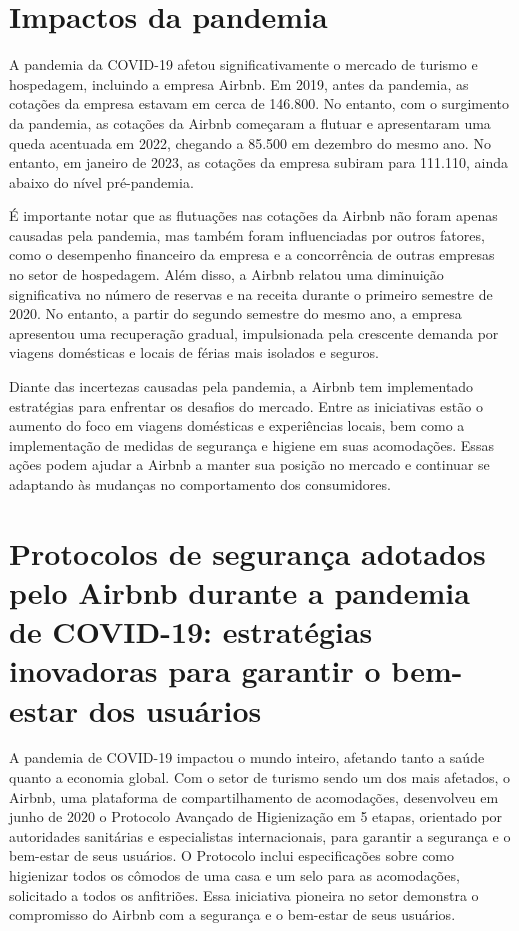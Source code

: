 \documentclass{article}
\begin{document}
\section*{Impactos da pandemia}
A pandemia da COVID-19 afetou significativamente o mercado de turismo e hospedagem, incluindo a empresa Airbnb. Em 2019, antes da pandemia, as cotações da empresa estavam em cerca de 146.800. No entanto, com o surgimento da pandemia, as cotações da Airbnb começaram a flutuar e apresentaram uma queda acentuada em 2022, chegando a 85.500 em dezembro do mesmo ano. No entanto, em janeiro de 2023, as cotações da empresa subiram para 111.110, ainda abaixo do nível pré-pandemia.

É importante notar que as flutuações nas cotações da Airbnb não foram apenas causadas pela pandemia, mas também foram influenciadas por outros fatores, como o desempenho financeiro da empresa e a concorrência de outras empresas no setor de hospedagem. Além disso, a Airbnb relatou uma diminuição significativa no número de reservas e na receita durante o primeiro semestre de 2020. No entanto, a partir do segundo semestre do mesmo ano, a empresa apresentou uma recuperação gradual, impulsionada pela crescente demanda por viagens domésticas e locais de férias mais isolados e seguros.

Diante das incertezas causadas pela pandemia, a Airbnb tem implementado estratégias para enfrentar os desafios do mercado. Entre as iniciativas estão o aumento do foco em viagens domésticas e experiências locais, bem como a implementação de medidas de segurança e higiene em suas acomodações. Essas ações podem ajudar a Airbnb a manter sua posição no mercado e continuar se adaptando às mudanças no comportamento dos consumidores.
\section*{Protocolos de segurança adotados pelo Airbnb durante a pandemia de COVID-19: estratégias inovadoras para garantir o bem-estar dos usuários}

A pandemia de COVID-19 impactou o mundo inteiro, afetando tanto a saúde quanto a economia global. Com o setor de turismo sendo um dos mais afetados, o Airbnb, uma plataforma de compartilhamento de acomodações, desenvolveu em junho de 2020 o Protocolo Avançado de Higienização em 5 etapas, orientado por autoridades sanitárias e especialistas internacionais, para garantir a segurança e o bem-estar de seus usuários. O Protocolo inclui especificações sobre como higienizar todos os cômodos de uma casa e um selo para as acomodações, solicitado a todos os anfitriões. Essa iniciativa pioneira no setor demonstra o compromisso do Airbnb com a segurança e o bem-estar de seus usuários.
\end{document}
